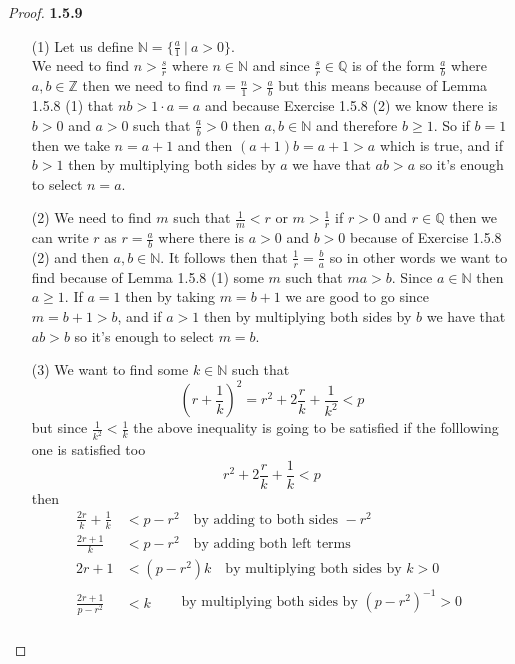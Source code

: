 \documentclass[11pt]{article}
\newcommand{\N}{\mathbb{N}}
\newcommand{\Z}{\mathbb{Z}}
\newcommand{\Q}{\mathbb{Q}}
\theoremstyle{definition}
\begin{document}
    \begin{proof}{\textbf{1.5.9}}
    \begin{itemize}
        \item [(1)]
        Let us define $\N = \{\frac{a}{1}~|~a>0\}$.\\
        We need to find $n>\frac{s}{r}$ where $n\in \N$ and since $\frac{s}{r} \in \Q$
        is of the form $\frac{a}{b}$ where $a,b \in \Z$ then we need to find
        $n=\frac{n}{1}>\frac{a}{b}$ but this means because of Lemma 1.5.8 (1) that
        $nb>1\cdot a = a$ and because Exercise 1.5.8 (2) we know there is $b > 0$ and
        $a>0$ such that $\frac{a}{b}>0$ then $a,b \in \N$ and therefore $b \geq 1$. So
        if $b=1$ then we take $n=a+1$ and then $(a+1)b = a+1>a$ which is true, and if
        $b>1$ then by multiplying both sides by $a$ we have that $ab>a$ so it's enough
        to select $n=a$.
        \item [(2)]
        We need to find $m$ such that $\frac{1}{m}<r$ or $m>    \frac{1}{r}$ if $r>0$ and $r\in \Q$ then we can
        write $r$ as $r = \frac{a}{b}$ where there is $a>0$ and $b>0$ because of
        Exercise 1.5.8 (2) and then $a,b \in \N$. It follows then that
        $\frac{1}{r} = \frac{b}{a}$ so in other words we want to find because of
        Lemma 1.5.8 (1) some $m$ such that $ma>b$. Since $a \in \N$ then $a \geq 1$. If
        $a=1$ then by taking $m=b+1$ we are good to go since $m=b+1>b$, and if $a>1$
        then by multiplying both sides by $b$ we have that $ab>b$ so it's enough
        to select $m=b$.
\cleardoublepage
        \item [(3)]
        We want to find some $k \in \N$ such that
        $$\left(r+\frac{1}{k}\right)^2=r^2+2\frac{r}{k}+\frac{1}{k^2}<p$$
        but since $\frac{1}{k^2}<\frac{1}{k}$ the above inequality is going to be
        satisfied if the folllowing one is satisfied too
        $$r^2+2\frac{r}{k}+\frac{1}{k}<p$$
        then
        \begin{align*}
            \frac{2r}{k}+\frac{1}{k} &< p-r^2 \quad \text{by adding to both sides }-r^2\\
            \frac{2r+1}{k} &< p- r^2 \quad \text{by adding both left terms}\\
            2r+1 &< (p-r^2)k \quad \text{by multiplying both sides by }k>0\\
            \frac{2r+1}{p-r^2} &< k \quad \begin{aligned}&\text{by multiplying both sides by }(p-r^2)^{-1}>0\\

\end{aligned}
\end{align*}
\end{itemize}
\end{proof}
\end{document}
